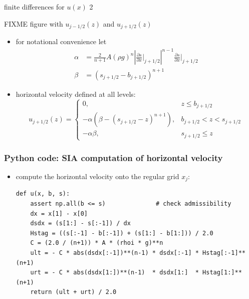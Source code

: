 \documentclass[10pt,dvipsnames]{beamer}
\begin{document}
\begin{frame}{finite differences for $u(x)$ 2}

\begin{center}
FIXME figure with $u_{j-1/2}(z)$ and $u_{j+1/2}(z)$
\end{center}

\begin{itemize}
\item for notational convenience let
\begin{align*}
\alpha &= \frac{2}{n+1} A (\rho g)^n \left|\frac{\partial s}{\partial x}\Big|_{j+1/2}\right|^{n-1} \frac{\partial s}{\partial x}\Big|_{j+1/2} \\
\beta  &= \left(s_{j+1/2} - b_{j+1/2}\right)^{n+1}
\end{align*}
\item \alert{horizontal velocity defined at all levels}:
    $$u_{j+1/2}(z) = \begin{cases} 0, & z \le b_{j+1/2} \\
                                   -\alpha \left(\beta - (s_{j+1/2} - z)^{n+1}\right), & b_{j+1/2} < z < s_{j+1/2} \\
                                   -\alpha \beta, & s_{j+1/2} \le z \end{cases}$$
\end{itemize}
\end{frame}


\begin{frame}[fragile]
\frametitle{Python code: SIA computation of horizontal velocity}

\begin{itemize}
\item compute the horizontal velocity onto the regular grid $x_j$:
\begin{lstlisting}[language=PythonPlus]
def u(x, b, s):
    assert np.all(b <= s)              # check admissibility
    dx = x[1] - x[0]
    dsdx = (s[1:] - s[:-1]) / dx
    Hstag = ((s[:-1] - b[:-1]) + (s[1:] - b[1:])) / 2.0
    C = (2.0 / (n+1)) * A * (rhoi * g)**n
    ult = - C * abs(dsdx[:-1])**(n-1) * dsdx[:-1] * Hstag[:-1]**(n+1)
    urt = - C * abs(dsdx[1:])**(n-1)  * dsdx[1:]  * Hstag[1:]**(n+1)
    return (ult + urt) / 2.0
\end{lstlisting}
\end{itemize}
\end{frame}
\end{document}
